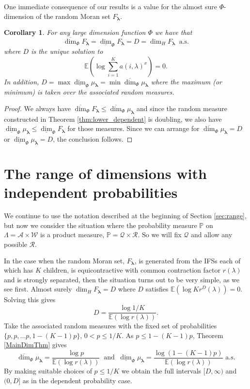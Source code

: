 \documentclass{amsart}
\newtheorem{corollary}[theorem]{Corollary}
\theoremstyle{plain}
\numberwithin{equation}{section}
\renewcommand{\P}{{\mathbb P}}
\newcommand{\cR}{{\mathcal R}}
\newcommand{\cQ}{{\mathcal Q}}
\newcommand{\cA}{{\mathcal A}}
\newcommand{\cW}{{\mathcal W}}
\newcommand{\blambda}{{\boldsymbol{\lambda}}}
\newcommand{\ee}{{\mathbb E}}
\newcommand{\odim}{\overline{\dim}}
\newcommand{\udim}{\underline{\dim}}
\begin{document}
One immediate consequence of our results is a value for the almost sure $\Phi$-dimension of the random Moran set $F_\blambda$.

\begin{corollary} \label{cor:asdimF}
For any large dimension function $\Phi$ we have that 
\[
   \odim_\Phi F_\blambda = \udim_\Phi F_\blambda = D = \dim_H F_\blambda \ \text{ a.s.}
\]
where $D$ is the unique solution to
\[
      \ee(\log \sum_{i=1}^K a(i,\lambda)^x)=0.
\]
In addition,  $D=\max \udim_{\Phi}\mu_\blambda =\min \odim_{\Phi}\mu_\blambda$ 
where the maximum (or minimum) is taken over the associated random measures.
\end{corollary}

\begin{proof}
We always have $\odim_\Phi F_\blambda \le \odim_\Phi \mu_\blambda$ and since the random measure constructed in Theorem \ref{thm:lower_dependent} is doubling, we also have $\udim_\Phi \mu_\blambda \le \udim_\Phi F_\blambda$ for those measures.
Since we can arrange for $\odim_\Phi \mu_\blambda = D$ or $\udim_\Phi \mu_\blambda = D$, the conclusion follows.
\end{proof}



\section{The range of dimensions with independent probabilities}
\label{sec:independentrange}

We continue to use the notation described at the beginning of Section \ref{sec:range}, but now we consider the situation where the probability measure $\P$ on $\Lambda = \cA \times \cW$ is a 
product measure, $\P = \cQ \times \cR$. So we will fix $\cQ$ and allow any possible $\cR$.

In the case when the random Moran set, $F_\blambda$, is generated from the IFSs each of which has $K$ children, is equicontractive with common contraction factor $r(\lambda)$ and is strongly separated, then the situation turns out to be very simple, as we see first.
Almost surely $\dim _{H}F_{{\boldsymbol{\lambda }}}=D$ where $D$ satisfies 
${\ee}(\log K r^{D}(\lambda ))=0$. 
Solving this gives 
\begin{equation*}
   D=\frac{\log 1/K}{{\ee}(\log r(\lambda ))}.
\end{equation*}
Take the associated random measures with the fixed set of probabilities $\{p,p,...p,1-(K-1)p\}$, $0<p\leq 1/K$. 
As $p\leq 1-(K-1)p$, Theorem \ref{MainDimThm} gives 
\begin{equation*}
   \odim_{\Phi}\mu_\blambda=\frac{\log p}{\ee(\log r(\lambda))}\ \text{ and } \ 
    \udim_{\Phi}\mu_\blambda=\frac{\log (1-(K-1)p)}{\ee(\log r(\lambda))}\text{ a.s.}
\end{equation*}
By making suitable choices of $p\leq 1/K$ we obtain the full intervals $[D,\infty)$ 
and $(0,D]$ as in the dependent probability case. 
\end{document}

